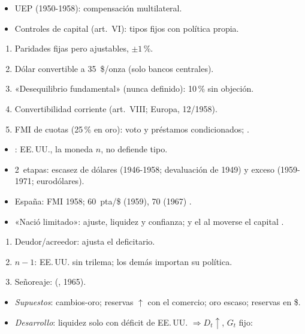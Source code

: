 \documentclass{article}
\begin{document}
\begin{columnas}
\begin{itemize}
\item UEP (1950-1958): compensación multilateral.
\item Controles de capital (art.~VI): tipos fijos con política propia.
\end{itemize}
\begin{enumerate}
\item Paridades fijas pero ajustables, $\pm1$\,\%.
\item Dólar convertible a 35~\$/onza (solo bancos centrales).
\item «Desequilibrio fundamental» (nunca definido): 10\,\% sin objeción.
\item Convertibilidad corriente (art.~VIII; Europa, 12/1958).
\item FMI de cuotas (25\,\% en oro): voto y préstamos condicionados; .
\end{enumerate}
\begin{itemize}
\item {}: EE.\,UU., la moneda $n$, no defiende tipo.
\item 2~etapas: escasez de dólares (1946-1958; devaluación de 1949) y exceso (1959-1971; eurodólares).
\item España: FMI 1958; 60~pta/\$ (1959), 70 (1967) .
\end{itemize}
\begin{itemize}
\item «Nació limitado»: ajuste, liquidez y confianza; y el  al moverse el capital .
\end{itemize}
\begin{enumerate}
\item Deudor/acreedor: ajusta el deficitario.
\item $n-1$: EE.\,UU. sin trilema; los demás importan su política.
\item Señoreaje:  (, 1965).
\end{enumerate}
\begin{itemize}
\item \emph{Supuestos}: cambios-oro; reservas $\uparrow$ con el comercio; oro escaso; reservas en \$.
\item \emph{Desarrollo}: liquidez solo con déficit de EE.\,UU. $\Rightarrow D_t\uparrow$, $G_t$ fijo:

\end{itemize}
\end{columnas}
\end{document}
